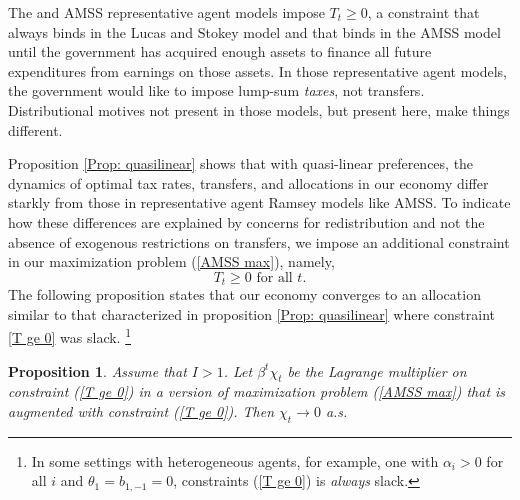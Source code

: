 \documentclass[thmsb,11pt]{article}
\newtheorem{proposition}{Proposition}
\begin{document}
The \cite{LucasJr.1983} and AMSS representative agent models
impose $T_{t}\geq 0$, a constraint that always binds in the Lucas and Stokey
model and that binds in the AMSS model  until the government has acquired enough
assets to finance all future expenditures from earnings on those assets. In those
representative agent models, the government would like to impose lump-sum \emph{taxes}, not
transfers. Distributional motives not present in those models, but present here, make things  different.
\smallskip

\smallskip Proposition \ref{Prop: quasilinear} shows that with quasi-linear preferences,  the dynamics of optimal
 tax rates, transfers,  and allocations in our economy differ starkly
 from those in representative agent Ramsey models like AMSS. To indicate how these differences are explained by concerns for redistribution and not the absence of exogenous restrictions on transfers, we impose an additional constraint in our maximization problem (\ref{AMSS max}), namely,
\begin{equation}
T_{t}\geq 0\text{ for all }t.  \label{T ge 0}
\end{equation}%
The following proposition states that our economy converges to an allocation similar to that characterized  in proposition \ref{Prop: quasilinear} where constraint \eqref{T ge 0} was slack. \footnote{In some settings with heterogeneous
agents, for example, one with $\alpha_i >0$ for all $i$ and $\theta_1 = b_{1,-1} =0$, constraints (\ref{T ge 0}) is \emph{always} slack.}
\smallskip

\begin{proposition}\label{prop:AMSS_killer1}
Assume that $I > 1$.
Let $\beta ^{t}\chi _{t}$ be the Lagrange multiplier on constraint (\ref{T
ge 0}) in a version of  maximization problem (\ref{AMSS max}) that is augmented with constraint (\ref{T
ge 0}). Then $\chi _{t}\rightarrow
0 $ a.s.
\end{proposition}
\end{document}
